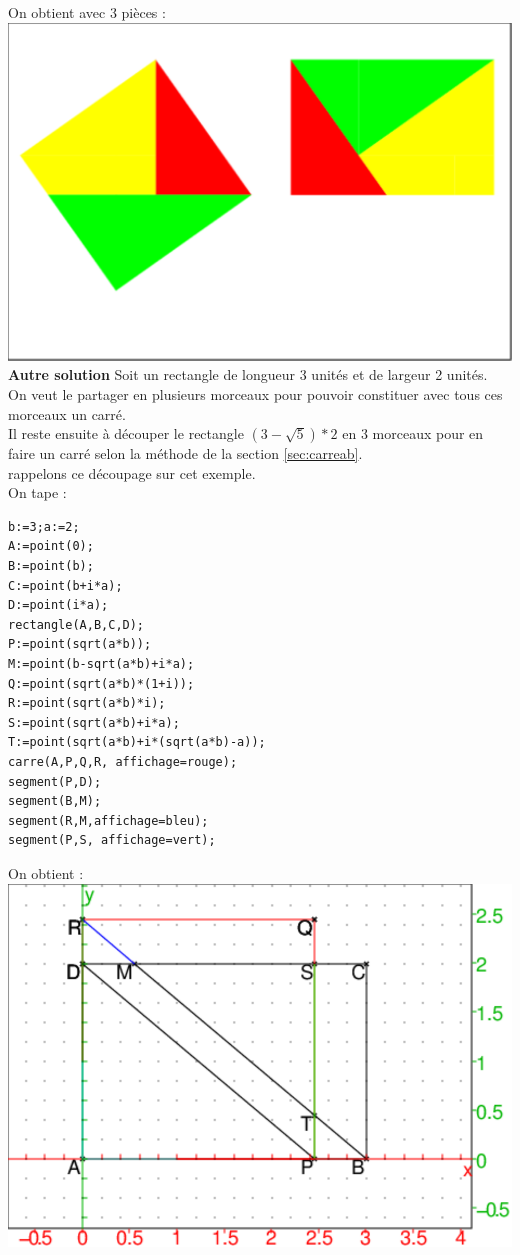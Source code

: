 \documentclass[a4paper,11pt]{book}
\begin{document}
On obtient avec 3 pi\`eces :\\
\includegraphics[width=\textwidth]{carresqrt63}
{\bf Autre solution}
Soit un rectangle de longueur 3 unit\'es et de largeur 2 unit\'es.\\
On veut le partager en plusieurs morceaux pour pouvoir constituer avec 
tous ces morceaux un carr\'e.\\
Il reste ensuite \`a d\'ecouper le rectangle $(3-\sqrt 5)*2$ en 3 morceaux pour
en faire un carr\'e selon la m\'ethode de la section \ref{sec:carreab}.\\
rappelons ce d\'ecoupage sur cet exemple.\\
On tape :
\begin{verbatim}
b:=3;a:=2;
A:=point(0);
B:=point(b);
C:=point(b+i*a);
D:=point(i*a);
rectangle(A,B,C,D);
P:=point(sqrt(a*b));
M:=point(b-sqrt(a*b)+i*a);
Q:=point(sqrt(a*b)*(1+i));
R:=point(sqrt(a*b)*i);
S:=point(sqrt(a*b)+i*a);
T:=point(sqrt(a*b)+i*(sqrt(a*b)-a));
carre(A,P,Q,R, affichage=rouge);
segment(P,D);
segment(B,M);
segment(R,M,affichage=bleu);
segment(P,S, affichage=vert);
\end{verbatim}
On obtient :\\
\includegraphics[width=\textwidth]{csarresqrt22}\\
\end{document}
